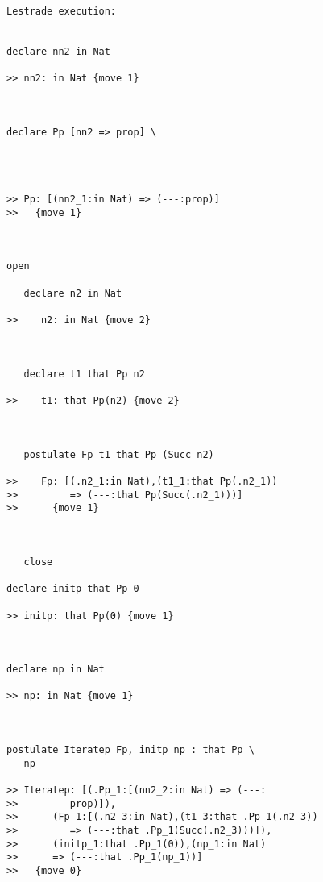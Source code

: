 \documentclass[12pt]{article}
\begin{document}
\begin{verbatim}Lestrade execution:


declare nn2 in Nat

>> nn2: in Nat {move 1}



declare Pp [nn2 => prop] \
   



>> Pp: [(nn2_1:in Nat) => (---:prop)]
>>   {move 1}



open

   declare n2 in Nat

>>    n2: in Nat {move 2}



   declare t1 that Pp n2

>>    t1: that Pp(n2) {move 2}



   postulate Fp t1 that Pp (Succ n2)

>>    Fp: [(.n2_1:in Nat),(t1_1:that Pp(.n2_1))
>>         => (---:that Pp(Succ(.n2_1)))]
>>      {move 1}



   close

declare initp that Pp 0

>> initp: that Pp(0) {move 1}



declare np in Nat

>> np: in Nat {move 1}



postulate Iteratep Fp, initp np : that Pp \
   np

>> Iteratep: [(.Pp_1:[(nn2_2:in Nat) => (---:
>>         prop)]),
>>      (Fp_1:[(.n2_3:in Nat),(t1_3:that .Pp_1(.n2_3))
>>         => (---:that .Pp_1(Succ(.n2_3)))]),
>>      (initp_1:that .Pp_1(0)),(np_1:in Nat)
>>      => (---:that .Pp_1(np_1))]
>>   {move 0}


\end{verbatim}
\end{document}
